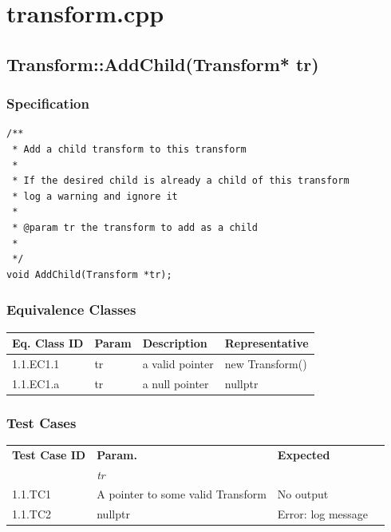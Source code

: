 \documentclass[11pt]{article}
\date{\today}
\title{}
\begin{document}
\setcounter{tocdepth}{2}
\tableofcontents
\section{transform.cpp}
\label{sec:orgf2b9a9a}

\subsection{Transform::AddChild(Transform* tr)}
\label{sec:org97b054c}
\subsubsection*{Specification}
\label{sec:orgbd688dd}
\begin{verbatim}
/**
 * Add a child transform to this transform
 *
 * If the desired child is already a child of this transform
 * log a warning and ignore it
 *
 * @param tr the transform to add as a child
 *
 */
void AddChild(Transform *tr);

\end{verbatim}
\subsubsection*{Equivalence Classes}
\label{sec:org93c335f}
\begin{center}
\begin{tabularx}{\textwidth}{lXXX}
\hline
\textbf{Eq. Class ID} & \textbf{Param} & \textbf{Description} & \textbf{Representative}\\
\hline
1.1.EC1.1 & tr & a valid pointer & new Transform()\\
\hline
1.1.EC1.a & tr & a null pointer & nullptr\\
\hline
\end{tabularx}
\end{center}
\subsubsection*{Test Cases}
\label{sec:orgf5a1e24}
\begin{center}
\begin{tabularx}{\textwidth}{lXXX}
\hline
\textbf{Test Case ID} & \textbf{Param.} & \textbf{Expected}\\
 & \textit{tr} & \\
\hline
1.1.TC1 & A pointer to some valid Transform & No output\\
\hline
1.1.TC2 & nullptr & Error: log message\\
\hline
\end{tabularx}
\end{center}
\end{document}
